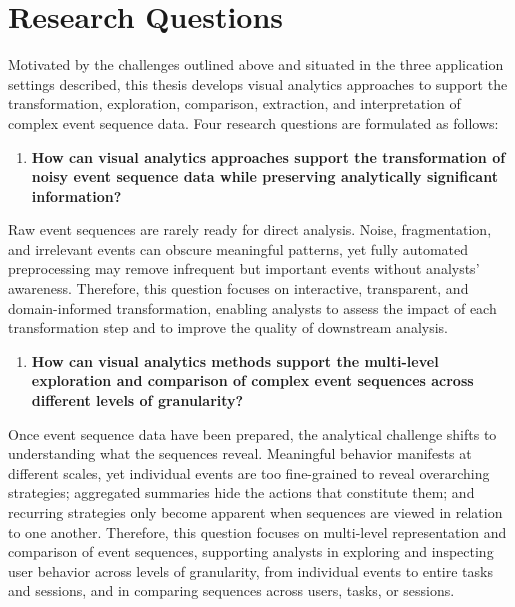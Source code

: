 \section{Research Questions}

Motivated by the challenges outlined above and situated in the three application settings described, this thesis develops visual analytics approaches to support the transformation, exploration, comparison, extraction, and interpretation of complex event sequence data.
Four research questions are formulated as follows:

\begin{enumerate}
    \renewcommand{\labelenumi}{RQ\arabic{enumi}.}
    \setcounter{enumi}{0}
    \item 
    \textbf{How can visual analytics approaches support the transformation of noisy event sequence data while preserving analytically significant information?}
\end{enumerate}
Raw event sequences are rarely ready for direct analysis.
Noise, fragmentation, and irrelevant events can obscure meaningful patterns, yet fully automated preprocessing may remove infrequent but important events without analysts' awareness.
Therefore, this question focuses on interactive, transparent, and domain-informed transformation, enabling analysts to assess the impact of each transformation step and to improve the quality of downstream analysis.

\begin{enumerate}
    \renewcommand{\labelenumi}{RQ\arabic{enumi}.}
    \setcounter{enumi}{1}
    \item 
    \textbf{How can visual analytics methods support the multi-level exploration and comparison of complex event sequences across different levels of granularity?}
\end{enumerate}
Once event sequence data have been prepared, the analytical challenge shifts to understanding what the sequences reveal.
Meaningful behavior manifests at different scales, yet individual events are too fine-grained to reveal overarching strategies; aggregated summaries hide the actions that constitute them; and recurring strategies only become apparent when sequences are viewed in relation to one another.
Therefore, this question focuses on multi-level representation and comparison of event sequences, supporting analysts in exploring and inspecting user behavior across levels of granularity, from individual events to entire tasks and sessions, and in comparing sequences across users, tasks, or sessions.

